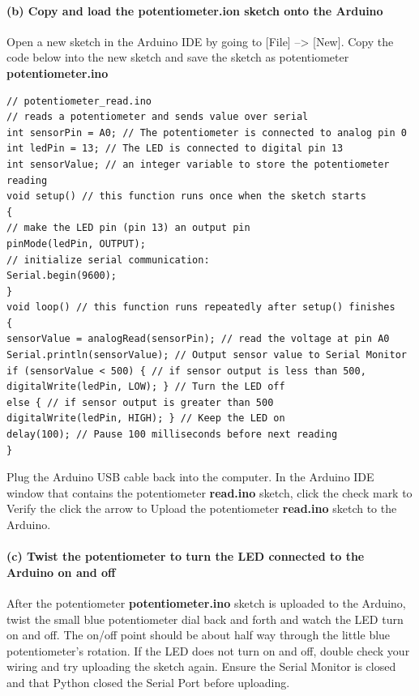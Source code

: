 \documentclass[11pt]{article}
\begin{document}
    \hypertarget{b-copy-and-load-the-potentiometer.ion-sketch-onto-the-arduino}{%
\paragraph{(b) Copy and load the potentiometer.ion sketch onto the
Arduino}\label{b-copy-and-load-the-potentiometer.ion-sketch-onto-the-arduino}}

Open a new sketch in the Arduino IDE by going to {[}File{]}
--\textgreater{} {[}New{]}. Copy the code below into the new sketch and
save the sketch as potentiometer \textbf{potentiometer.ino}

\begin{verbatim}
// potentiometer_read.ino
// reads a potentiometer and sends value over serial
int sensorPin = A0; // The potentiometer is connected to analog pin 0
int ledPin = 13; // The LED is connected to digital pin 13
int sensorValue; // an integer variable to store the potentiometer reading
void setup() // this function runs once when the sketch starts
{
// make the LED pin (pin 13) an output pin
pinMode(ledPin, OUTPUT);
// initialize serial communication:
Serial.begin(9600);
}
void loop() // this function runs repeatedly after setup() finishes
{
sensorValue = analogRead(sensorPin); // read the voltage at pin A0
Serial.println(sensorValue); // Output sensor value to Serial Monitor
if (sensorValue < 500) { // if sensor output is less than 500,
digitalWrite(ledPin, LOW); } // Turn the LED off
else { // if sensor output is greater than 500
digitalWrite(ledPin, HIGH); } // Keep the LED on
delay(100); // Pause 100 milliseconds before next reading
}
\end{verbatim}

Plug the Arduino USB cable back into the computer. In the Arduino IDE
window that contains the potentiometer \textbf{read.ino} sketch, click
the check mark to Verify the click the arrow to Upload the potentiometer
\textbf{read.ino} sketch to the Arduino.

    \hypertarget{c-twist-the-potentiometer-to-turn-the-led-connected-to-the-arduino-on-and-off}{%
\paragraph{(c) Twist the potentiometer to turn the LED connected to the
Arduino on and
off}\label{c-twist-the-potentiometer-to-turn-the-led-connected-to-the-arduino-on-and-off}}

After the potentiometer \textbf{potentiometer.ino} sketch is uploaded to
the Arduino, twist the small blue potentiometer dial back and forth and
watch the LED turn on and off. The on/off point should be about half way
through the little blue potentiometer's rotation. If the LED does not
turn on and off, double check your wiring and try uploading the sketch
again. Ensure the Serial Monitor is closed and that Python closed the
Serial Port before uploading.
\end{document}
